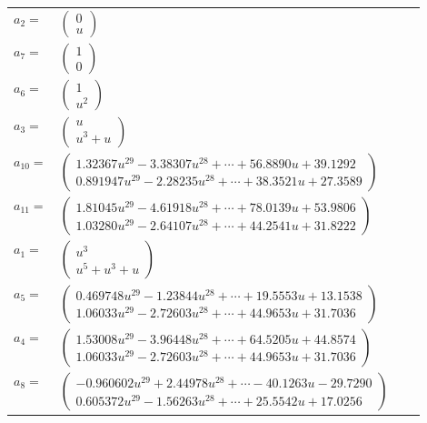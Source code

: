 \documentclass[1p]{elsarticle_modified}
\theoremstyle{definition}
\begin{document}
\begin{tabular}{m{7pt} m{180pt} m{7pt} m{180pt} }
\flushright $a_{2}=$&$\begin{pmatrix}0\\u\end{pmatrix}$ \\
\flushright $a_{7}=$&$\begin{pmatrix}1\\0\end{pmatrix}$ \\
\flushright $a_{6}=$&$\begin{pmatrix}1\\u^2\end{pmatrix}$ \\
\flushright $a_{3}=$&$\begin{pmatrix}u\\u^3+u\end{pmatrix}$ \\
\flushright $a_{10}=$&$\begin{pmatrix}1.32367 u^{29}-3.38307 u^{28}+\cdots+56.8890 u+39.1292\\0.891947 u^{29}-2.28235 u^{28}+\cdots+38.3521 u+27.3589\end{pmatrix}$ \\
\flushright $a_{11}=$&$\begin{pmatrix}1.81045 u^{29}-4.61918 u^{28}+\cdots+78.0139 u+53.9806\\1.03280 u^{29}-2.64107 u^{28}+\cdots+44.2541 u+31.8222\end{pmatrix}$ \\
\flushright $a_{1}=$&$\begin{pmatrix}u^3\\u^5+u^3+u\end{pmatrix}$ \\
\flushright $a_{5}=$&$\begin{pmatrix}0.469748 u^{29}-1.23844 u^{28}+\cdots+19.5553 u+13.1538\\1.06033 u^{29}-2.72603 u^{28}+\cdots+44.9653 u+31.7036\end{pmatrix}$ \\
\flushright $a_{4}=$&$\begin{pmatrix}1.53008 u^{29}-3.96448 u^{28}+\cdots+64.5205 u+44.8574\\1.06033 u^{29}-2.72603 u^{28}+\cdots+44.9653 u+31.7036\end{pmatrix}$ \\
\flushright $a_{8}=$&$\begin{pmatrix}-0.960602 u^{29}+2.44978 u^{28}+\cdots-40.1263 u-29.7290\\0.605372 u^{29}-1.56263 u^{28}+\cdots+25.5542 u+17.0256\end{pmatrix}$ \\

\end{tabular}
\end{document}
